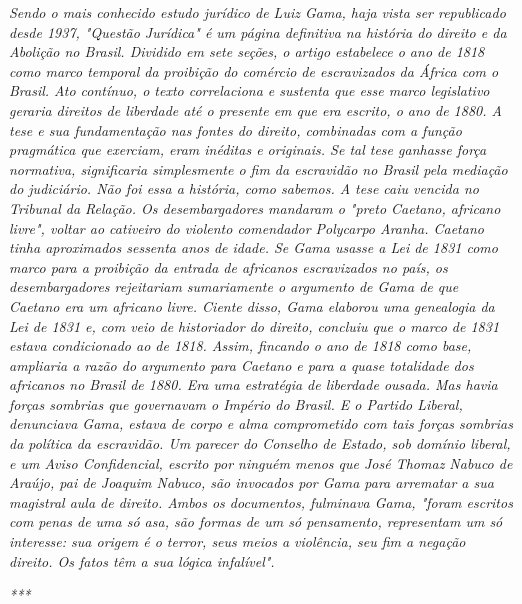\emph{Sendo o mais conhecido estudo jurídico de Luiz Gama, haja vista
ser republicado desde 1937, "Questão Jurídica" é um página definitiva na
história do direito e da Abolição no Brasil. Dividido em sete seções, o
artigo estabelece o ano de 1818 como marco temporal da proibição do
comércio de escravizados da África com o Brasil. Ato contínuo, o texto
correlaciona e sustenta que esse marco legislativo geraria direitos de
liberdade até o presente em que era escrito, o ano de 1880. A tese e sua
fundamentação nas fontes do direito, combinadas com a função pragmática
que exerciam, eram inéditas e originais. Se tal tese ganhasse força
normativa, significaria simplesmente o fim da escravidão no Brasil pela
mediação do judiciário. Não foi essa a história, como sabemos. A tese
caiu vencida no Tribunal da Relação. Os desembargadores mandaram o
"preto Caetano, africano livre", voltar ao cativeiro do violento
comendador Polycarpo Aranha. Caetano tinha aproximados sessenta anos de
idade. Se Gama usasse a Lei de 1831 como marco para a proibição da
entrada de africanos escravizados no país, os desembargadores
rejeitariam sumariamente o argumento de Gama de que Caetano era um
africano livre. Ciente disso, Gama elaborou uma genealogia da Lei de
1831 e, com veio de historiador do direito, concluiu que o marco de 1831
estava condicionado ao de 1818. Assim, fincando o ano de 1818 como base,
ampliaria a razão do argumento para Caetano e para a quase totalidade
dos africanos no Brasil de 1880. Era uma estratégia de liberdade ousada.
Mas havia forças sombrias que governavam o Império do Brasil. E o
Partido Liberal, denunciava Gama, estava de corpo e alma comprometido
com tais forças sombrias da política da escravidão. Um parecer do
Conselho de Estado, sob domínio liberal, e um Aviso Confidencial,
escrito por ninguém menos que José Thomaz Nabuco de Araújo, pai de
Joaquim Nabuco, são invocados por Gama para arrematar a sua magistral
aula de direito. Ambos os documentos, fulminava Gama, "foram escritos
com penas de uma só asa, são formas de um só pensamento, representam um
só interesse: sua origem é o terror, seus meios a violência, seu fim a
negação direito. Os fatos têm a sua lógica infalível". }

\emph{***}

